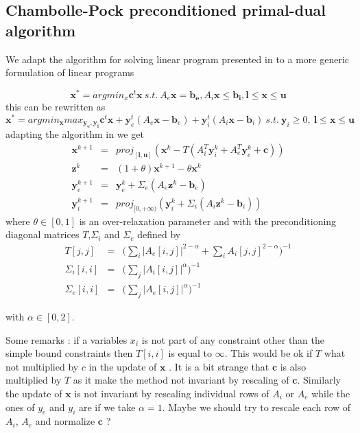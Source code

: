 \documentclass[11pt]{article}
\begin{document}
\subsection{Chambolle-Pock preconditioned primal-dual algorithm}
We adapt the algorithm for solving linear program presented in \cite{Chambolle2011} to a more generic formulation of linear programs


\begin{equation}
\mathbf{x}^*=argmin_x \mathbf{c}^t\mathbf{x} ~  s.t.~  A_e\mathbf{x}=\mathbf{b_e},A_i\mathbf{x}\leq\mathbf{ b_i}, \mathbf{l}\leq \mathbf{x}\leq \mathbf{u} 
\end{equation}
this can be rewritten as 
\begin{equation}
\mathbf{x}^*=argmin_\mathbf{x} max_{\mathbf{y_e},\mathbf{y_i}}\mathbf{c}^t\mathbf{x}+\mathbf{y}_e^t(A_e\mathbf{x}-\mathbf{b}_e)+ \mathbf{y}_i^t(A_i\mathbf{x}-\mathbf{b}_i)~  s.t.~ \mathbf{y}_i\geq 0,~ \mathbf{l}\leq \mathbf{x}\leq \mathbf{u} 
\end{equation}
adapting the algorithm in \cite{Chambolle2011}  we get
\begin{eqnarray}
\mathbf{x}^{k+1}&=&proj_{[\mathbf{l},\mathbf{u}]} (\mathbf{x}^k-T(A_i^T\mathbf{y}_i^k+A_e^T\mathbf{y}_e^k+\mathbf{c}))\\
\mathbf{z}^k&=&(1+\theta)\mathbf{x}^{k+1}-\theta \mathbf{x}^k\\
\mathbf{y}_e^{k+1}&=&\mathbf{y}_e^k+\Sigma_e(A_e \mathbf{z}^k-\mathbf{b}_e)\\
\mathbf{y}_i^{k+1}&=&proj_{[0,+\infty)}(\mathbf{y}_i^k+\Sigma_i(A_i \mathbf{z}^k-\mathbf{b}_i))
\end{eqnarray}
where $\theta\in[0,1]$ is an over-relaxation parameter and with the preconditioning diagonal matrices $T$,$\Sigma_i$ and $\Sigma_e$ defined by
\begin{eqnarray}
T[j,j]&=&\big(\sum_i |A_e[i,j]|^{2-\alpha}+\sum_i A_i[j,j]^{2-\alpha}\big)^{-1}\\
\Sigma_i[i,i]&=&\big(\sum_j |A_i[i,j]|^{\alpha}\big)^{-1}\\
\Sigma_e[i,i]&=&\big(\sum_j |A_e[i,j]|^{\alpha}\big)^{-1}
\end{eqnarray}

with $\alpha\in[0,2]$.


Some remarks : if a variables $x_i$ is  not part of any constraint other than the simple bound constraints then  $T[i,i]$ is equal to $\infty$. This would be ok if $T$ what not multiplied by $c$ in the update of $\mathbf{x}$ .
It is a bit strange that $\mathbf{c}$ is also multiplied by $T$ as it make the method not invariant by rescaling of $\mathbf{c}$. Similarly the update of $\mathbf{x}$ is not invariant by rescaling individual rows of $A_i$ or $A_e$
while the ones of $y_e$ and $y_i$ are if we take $\alpha=1$.
Maybe we should try to rescale each row of $A_i$, $A_e$ and normalize $\mathbf{c}$ ?
\end{document}
